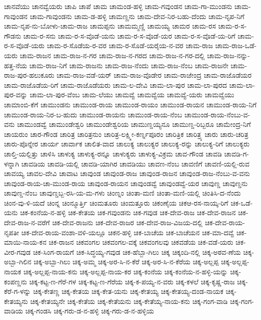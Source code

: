 ಚಾನವೆಯು
ಚಾನವ್ವೆಯರು
ಚಾಪಿ
ಚಾಪೆ
ಚಾಮ
ಚಾಮಂಡ-ಹಳ್ಳಿ
ಚಾಮ-ಗವುಂಡನ
ಚಾಮ-ಗಾ-ಮುಂಡನು
ಚಾಮ-ಗಾವುಂಡನ
ಚಾಮ-ಗಾವುಂಡನು
ಚಾಮ-ಡ-ಹಳ್ಳಿ
ಚಾಮಣ್ಣನು
ಚಾಮ-ದೇವ-ನಿರ-ಬಹು-ದೆಂದು
ಚಾಮ-ನೃಪ-ನಿಗೆ
ಚಾಮ-ನೃಪ-ನು-ಬೋಳು-ಚಾಮ-ರಾಜ
ಚಾಮಪ್ಪನು
ಚಾಮಮ್ಮಣ್ಣಿ
ಚಾಮಯ್ಯ
ಚಾಮರ
ಚಾಮ-ರಸ
ಚಾಮ-ರ-ಸ-ಗೌಡನು
ಚಾಮ-ರ-ಸನು
ಚಾಮ-ರ-ಸ-ವೊಡೆ-ಯನು
ಚಾಮ-ರ-ಸ-ವೊಡೆ-ಯರ
ಚಾಮ-ರ-ಸ-ವೊಡೆ-ಯ-ರಿಗೆ
ಚಾಮ-ರ-ಸ-ವೊಡೆ-ಯರು
ಚಾಮ-ರ-ಸೊಡೆಯ-ರ-ವರ
ಚಾಮ-ರ-ಸೊಡೆ-ಯರೈಯ-ನ-ವರ
ಚಾಮ-ರಾಜ
ಚಾಮ-ರಾಜ-ಒಡೆ-ಯರು
ಚಾಮ-ರಾಜನ
ಚಾಮ-ರಾಜ-ನ-ಗರ
ಚಾಮ-ರಾಜ-ನ-ಗರದ
ಚಾಮ-ರಾಜ-ನ-ಗರ-ದಲ್ಲಿ
ಚಾಮ-ರಾಜ-ನನ್ನು-ಹತ್ತ-ನೆಯ
ಚಾಮ-ರಾಜ-ನಿಗೆ
ಚಾಮ-ರಾಜನು
ಚಾಮ-ರಾಜ-ನೆಂದು
ಚಾಮ-ರಾಜ-ನೆಂಬ
ಚಾಮ-ರಾಜನೇ
ಚಾಮ-ರಾಜ-ಪುರ-ಹಲುಕೂರು
ಚಾಮ-ರಾಜ-ವಡೆ-ಯರ್
ಚಾಮ-ರಾಜ-ವೊಡೇರ
ಚಾಮ-ರಾಜೇಂದ್ರ
ಚಾಮ-ರಾಜೊಡೆಯರ
ಚಾಮ-ರಾಜೊಡೆಯ-ರಿಗೆ
ಚಾಮ-ರಾಜೊಡೆಯರು
ಚಾಮ-ಲ-ದೇವಿ
ಚಾಮ-ಲಾ-ಪುರ
ಚಾಮ-ಲಾ-ಪುರದ
ಚಾಮ-ಲಾ-ಪುರ-ವನ್ನು
ಚಾಮ-ಲಾ-ಪುರ-ವೆಂಬ
ಚಾಮ-ಲೆಯು
ಚಾಮವ್ವೆ
ಚಾಮವ್ವೆಯ
ಚಾಮವ್ವೆ-ಯರು
ಚಾಮವ್ವೆಯು
ಚಾಮಾಂಬಿ-ಕೆಗೆ
ಚಾಮುಂಡನು
ಚಾಮುಂಡ-ರಾಯ
ಚಾಮುಂಡ-ರಾಯಂ
ಚಾಮುಂಡ-ರಾಯನ
ಚಾಮುಂಡ-ರಾಯ-ನಿಗೆ
ಚಾಮುಂಡ-ರಾಯ-ನಿರ-ಬ-ಹುದು
ಚಾಮುಂಡ-ರಾಯನು
ಚಾಮುಂಡ-ರಾಯ-ನೆಂಬ
ಚಾಮುಂಡ-ರಾಯ-ನೆಂಬು-ವ-ವನು
ಚಾಮುಂಡವ್ವೆ
ಚಾಮುಂಡೇಶ್ವರಿ
ಚಾಮುಂಡೇಶ್ವರಿಯ
ಚಾಮುಣ್ಡಯ್ಯನೂ
ಚಾಮುಣ್ಡ-ರಿಬ್ಬರೂ
ಚಾಮೇಂದ್ರ-ನಿಗೆ
ಚಾಯರುಂ
ಚಾರ-ಗೌಂಡ
ಚಾರಿತ್ರ
ಚಾರಿತ್ರನುಂ
ಚಾರಿತ್ರ-ಲಕ್ಷ್ಮೀ-ಕರ್ಣ್ನಪೂರಂ
ಚಾರಿತ್ರಿಕ
ಚಾರಿತ್ರ್ಯ
ಚಾರು
ಚಾರು-ಚರಿತ್ರ
ಚಾರು-ಪೊನ್ನೇರ
ಚಾರ್ಯ
ಚಾರ್ವಾಕ
ಚಾಲಿತ-ವಾದ
ಚಾಲುಕ್ಯ
ಚಾಲುಕ್ಯರ
ಚಾಲುಕ್ಯ-ರನ್ನು
ಚಾಲುಕ್ಯ-ರಿಗೆ
ಚಾಲುಕ್ಯರು
ಚಾಲ್ತಿ-ಯಲ್ಲಿತ್ತು
ಚಾಳಿಸಿ
ಚಾಳುಕ್ಯ
ಚಾಳುಕ್ಯ-ರನ್ನೂ
ಚಾಳುಕ್ಯರು
ಚಾಳುಕ್ಯ-ವಿಕ್ರಮ
ಚಾವ-ಗೌಂಡ
ಚಾವಡಿ
ಚಾವಡಿ-ಗ-ಳನ್ನಾಗಿ
ಚಾವಡಿಯ
ಚಾವಡಿ-ಯಲ್ಲಿ
ಚಾವಡಿ-ಯಾಗಿರ
ಚಾವಡಿಯು
ಚಾವಣ-ನೆಂಬ
ಚಾವಣಿಗೆ
ಚಾವಣಿ-ಯಲ್ಲಿ-ರುವ
ಚಾವಯ್ಯ
ಚಾವಲ-ದೇವಿ
ಚಾವಾಟ
ಚಾವುಂಡ
ಚಾವುಂಡ-ರಾಜ
ಚಾವುಂಡ-ರಾಜನ
ಚಾವುಂಡ-ರಾಜ-ನೆಂಬು-ವ-ವನು
ಚಾವುಂಡ-ರಾಯ-ಚಾ-ಮುಂಡ-ರಾಯ
ಚಾವುಂಡ-ರಾಯನ
ಚಾವುಂಡವ್ವೆ
ಚಾವುಂಡವ್ವೆ-ಯರ
ಚಾವುಣ್ಡ
ಚಾವುಣ್ಡನು
ಚಾವುಣ್ಡ-ನೆಂಬ
ಚಾವುಣ್ಡಬ್ಬ-ರಸಿ-ಯ-ಮ-ಗಳು
ಚಿಂಣ್ನಂ
ಚಿಂತಾ-ಮಣಿ
ಚಿಂತಾ-ಮಣಿ-ಯಲ್ಲಿ
ಚಿಂತಿಸಿ-ದ-ನೆಂದು
ಚಿಂನ-ವು-ಳಿ-ಯದೆ
ಚಿಂನ್ನ
ಚಿಂನ್ಮೂರ್ತ್ತಿ
ಚಿಂಮತೂರು
ಚಿಂಮತ್ತೂರು
ಚಿಕಂಣೈಯ
ಚಿಕಆ-ರಸ-ನಾಯ್ಕ-ರಿಗೆ
ಚಿಕ-ಒಡೆ-ಯನು
ಚಿಕ-ಕಂನೆಯ-ನ-ಹಳ್ಳಿ
ಚಿಕ-ಕೇತಯ
ಚಿಕ-ಗವುಂಡನು
ಚಿಕ-ಗವುಡ
ಚಿಕ-ದೇವ-ರಾಜ
ಚಿಕ-ದೇವ-ರಾಜನ
ಚಿಕ-ದೇವ-ರಾಜ-ನ-ವರೆಗೆ
ಚಿಕ-ದೇವ-ರಾಜನು
ಚಿಕ-ದೇವ-ರಾಜರ
ಚಿಕ-ದೇವ-ರಾಜ-ವಿಜಯ-ದಲ್ಲಿ
ಚಿಕ-ದೇವ-ರಾಯ-ನೃಪತೀ
ಚಿಕ-ದೇವ-ರಾಯ-ವಂಶಾ-ವಳಿ-ಯಲ್ಲೂ
ಚಿಕನ-ಹಳ್ಳಿ
ಚಿಕ-ಬಾಚೆಯ
ಚಿಕ-ಬಾಚೆಯನ
ಚಿಕ-ಮಾ-ದವ್ವೆ
ಚಿಕ-ಮಾಯಿ-ನಾಯ-ಕನ
ಚಿಕ-ರಾಜನ
ಚಿಕವಂಗಲ
ಚಿಕವಂಗಲ-ವಕ್ಕೆ
ಚಿಕವಂಗಲವು
ಚಿಕವಡೆಯ
ಚಿಕ-ವಡೆ-ಯರು
ಚಿಕ-ವೀರ-ಗವುಡ
ಚಿಕ-ಸಿಂಗ-ರಾಯಗೆ
ಚಿಕ-ಸಿದ್ಧಯ್ಯ-ಗವುಡ
ಚಿಕ-ಹೆಬ್ಬಾ-ಗಿಲು
ಚಿಕ್ಕ
ಚಿಕ್ಕಂದಿ-ನಲ್ಲಿ
ಚಿಕ್ಕ-ಅಠವ-ಣೆಯ
ಚಿಕ್ಕ-ಅಬ್ಬಾ-ಗಿಲಿನ
ಚಿಕ್ಕ-ಅಬ್ಬಾ-ಗಿಲು
ಚಿಕ್ಕ-ಅಮ್ಮ
ಚಿಕ್ಕ-ಅರ-ಸಿ-ನ-ಕೆರೆ
ಚಿಕ್ಕ-ಅರ-ಸಿ-ನ-ಕೆರೆಯ
ಚಿಕ್ಕ-ಅಲ್ಲಪ್ಪ
ಚಿಕ್ಕ-ಅಲ್ಲಪ್ಪ-ನಾಯಕ
ಚಿಕ್ಕ-ಅಲ್ಲಪ್ಪ-ನಾಯ-ಕನು
ಚಿಕ್ಕ-ಅಲ್ಲಪ್ಪ-ನಾಯ-ಕರ
ಚಿಕ್ಕ-ಕಂನೆಯ
ಚಿಕ್ಕ-ಕಂನೆಯ-ನ-ಹಳ್ಳಿ-ಯನ್ನು
ಚಿಕ್ಕ-ಕಂಪಣ್ಣನು
ಚಿಕ್ಕ-ಕಟ್ಟ-ಣ-ಗೆರೆ-ಗಳ
ಚಿಕ್ಕ-ಕಟ್ಟ-ಣ-ಗೆರೆಯ
ಚಿಕ್ಕ-ಕ-ಪಯ್ಯ-ನ-ವರು
ಚಿಕ್ಕ-ಕಳಲೆ
ಚಿಕ್ಕ-ಕೃಷ್ಣ-ರಾಜ
ಚಿಕ್ಕ-ಕೆರೆ-ಗ-ಳನ್ನು
ಚಿಕ್ಕ-ಕೇತಣ್ಣ
ಚಿಕ್ಕ-ಕೇತಯ
ಚಿಕ್ಕ-ಕೇತ-ಯನು
ಚಿಕ್ಕ-ಕೇತಯ್ಯ
ಚಿಕ್ಕ-ಕೇತಯ್ಯ-ದಂಡ-ನಾಯಕ
ಚಿಕ್ಕ-ಕೇತಯ್ಯನು
ಚಿಕ್ಕ-ಕೇತಯ್ಯನೇ
ಚಿಕ್ಕ-ಕೇತೆಯ
ಚಿಕ್ಕ-ಕೇತೆಯನು
ಚಿಕ್ಕ-ಕೇತೆಯ್ಯ-ನಾಯ-ಕನು
ಚಿಕ್ಕ-ಗಂಗ-ವಾಡಿ
ಚಿಕ್ಕ-ಗಂಗ-ವಾಡಿಯ
ಚಿಕ್ಕ-ಗಂಡಸಿ
ಚಿಕ್ಕ-ಗರು-ಡ-ನ-ಹಳ್ಳಿ
ಚಿಕ್ಕ-ಗರು-ಡ-ನ-ಹಳ್ಳಿಯ
